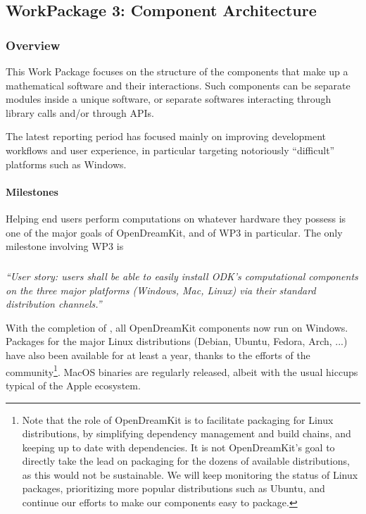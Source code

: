 \subsection{WorkPackage 3:  Component Architecture}

\subsubsection{Overview}

This Work Package focuses on the structure of the components that make
up a mathematical software and their interactions. Such components can
be separate modules inside a unique software, or separate softwares
interacting through library calls and/or through APIs.

The latest reporting period has focused mainly on improving
development workflows and user experience, in particular targeting
notoriously ``difficult'' platforms such as Windows.

\paragraph{Milestones} Helping end users perform computations on
whatever hardware they possess is one of the major goals of
OpenDreamKit, and of WP3 in particular. The only milestone involving
WP3 is

\subparagraph{}

\emph{“User story: users shall be able to easily install ODK's
    computational components on the three major platforms (Windows,
    Mac, Linux) via their standard distribution channels.”}

  With the completion of
  , all
  OpenDreamKit components now run on Windows. Packages for the major
  Linux distributions (Debian, Ubuntu, Fedora, Arch, ...) have also
  been available for at least a year, thanks to the efforts of the
  community\footnote{Note that the role of OpenDreamKit is to
    facilitate packaging for Linux distributions, by simplifying
    dependency management and build chains, and keeping up to date
    with dependencies. It is not OpenDreamKit's goal to directly take
    the lead on packaging for the dozens of available distributions,
    as this would not be sustainable. We will keep monitoring the
    status of Linux packages, prioritizing more popular distributions
    such as Ubuntu, and continue our efforts to make our components
    easy to package.}. MacOS binaries are regularly released, albeit
  with the usual hiccups typical of the Apple ecosystem.

